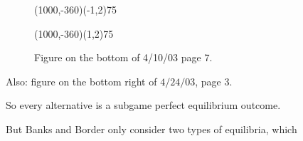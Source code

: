 \documentclass[12pt]{article}
\newcommand{\n}{\noindent}
\newcommand{\s}{\vspace{5mm}}
\begin{document}
\begin{figure}[htb]
\begin{egame}
\renewcommand{\egarrowstyle}{e}

\putbranch(1000,-360)(-1,2){75}

\renewcommand{\egarrowstyle}{}

\putbranch(1000,-360)(1,2){75}






%
\end{egame}
\hspace*{\fill}\s\s\s\s\s\s\s\s\s\s\s\s
\caption[]{Figure on the bottom of 4/10/03 page 7.}\label{f:thirteen}
\end{figure}

\begin{center}
Also: figure on the bottom right of $4/24/03$, page $3$.
\end{center}

\s
\n  So every alternative is a subgame perfect equilibrium outcome.

\s
\n But Banks and Border only consider two types of equilibria, which
\end{document}

